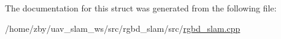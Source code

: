 The documentation for this struct was generated from the following file\-:\begin{DoxyCompactItemize}
\item 
/home/zby/uav\-\_\-slam\-\_\-ws/src/rgbd\-\_\-slam/src/\hyperlink{rgbd__slam_8cpp}{rgbd\-\_\-slam.\-cpp}\end{DoxyCompactItemize}

